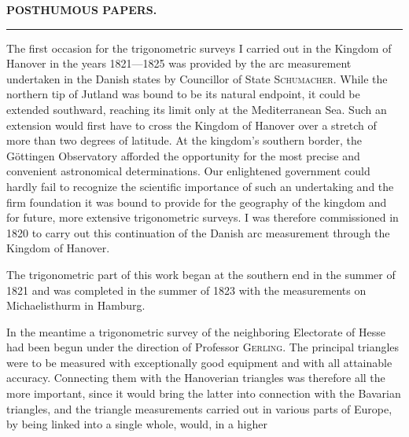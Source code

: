 \clearpage
\noindent{}\hfill{\small\textbf{POSTHUMOUS PAPERS.}}\hfill\null\par
\vspace{2.5\baselineskip}
\begin{center}
{\large{}}\par\medskip
\rule{.12\linewidth}{.4pt}\par\medskip
{\large{}}
\end{center}

\par\noindent\hspace*{\parindent}The first occasion for the trigonometric surveys I carried out in the Kingdom
of Hanover in the years 1821---1825 was provided by the arc measurement
undertaken in the Danish states by Councillor of State \textsc{Schumacher}.
While the northern tip of Jutland was bound to be its natural endpoint,
it could be extended southward, reaching its limit only at the Mediterranean Sea. Such an extension
would first have to cross the Kingdom of Hanover over a stretch of more
than two degrees of latitude. At the kingdom's southern border, the Göttingen
Observatory afforded the opportunity for the most precise and convenient
astronomical determinations. Our enlightened government could hardly fail
to recognize the scientific importance of such an undertaking and the firm
foundation it was bound to provide for the geography of the kingdom
and for future, more extensive trigonometric surveys. I was therefore
commissioned in 1820 to carry out this continuation of the Danish arc measurement
through the Kingdom of Hanover.

\par\noindent\hspace*{\parindent}The trigonometric part of this work began at the southern end in the
summer of 1821 and was completed in the summer of 1823 with the measurements
on Michaelisthurm in Hamburg.

\par\noindent\hspace*{\parindent}In the meantime a trigonometric survey of the neighboring Electorate
of Hesse had been begun under the direction of Professor \textsc{Gerling}. The
principal triangles were to be measured with exceptionally good equipment
and with all attainable accuracy. Connecting them with the Hanoverian
triangles was therefore all the more important, since it would bring the latter
into connection with the Bavarian triangles, and the triangle measurements
carried out in various parts of Europe, by being linked into a single whole, would, in a higher
\par\clearpage

